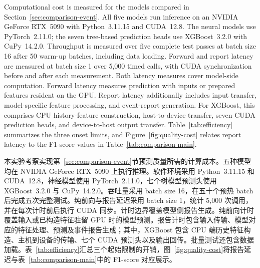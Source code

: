 \documentclass[a4paper,fleqn]{cas-dc}
\newcommand{\zhpara}[1]{%
  \par\begingroup\small\color{black!72}\noindent #1\par\endgroup}
\begin{document}
Computational cost is measured for the models compared in Section~\ref{sec:comparison-event}. All five models run inference on an NVIDIA GeForce RTX~5090 with Python~3.11.15 and CUDA~12.8. The neural models use PyTorch~2.11.0; the seven tree-based prediction heads use XGBoost~3.2.0 with CuPy~14.2.0. Throughput is measured over five complete test passes at batch size 16 after 50 warm-up batches, including data loading. Forward and report latency are measured at batch size 1 over 5,000 timed calls, with CUDA synchronization before and after each measurement. Both latency measures cover model-side computation. Forward latency measures prediction with inputs or prepared features resident on the GPU. Report latency additionally includes input transfer, model-specific feature processing, and event-report generation. For XGBoost, this comprises CPU history-feature construction, host-to-device transfer, seven CUDA prediction heads, and device-to-host output transfer. Table~\ref{tab:efficiency} summarizes the three onset limits, and Figure~\ref{fig:quality-cost} relates report latency to the F1-score values in Table~\ref{tab:comparison-main}.

\zhpara{本实验考察实现第~\ref{sec:comparison-event}节预测质量所需的计算成本。五种模型均在 NVIDIA GeForce RTX~5090 上执行推理。软件环境采用 Python~3.11.15 和 CUDA~12.8，神经模型使用 PyTorch~2.11.0，七个树模型预测头使用 XGBoost~3.2.0 与 CuPy~14.2.0。吞吐量采用 batch size 16，在五十个预热 batch 后完成五次完整测试。纯前向与报告延迟采用 batch size 1，统计 5,000 次调用，并在每次计时前后执行 CUDA 同步。计时边界覆盖模型侧报告生成。纯前向计时覆盖输入或已构造特征驻留 GPU 时的模型预测。报告计时包含输入传输、模型对应的特征处理、预测及事件报告生成；其中，XGBoost 包含 CPU 端历史特征构造、主机到设备的传输、七个 CUDA 预测头以及输出回传。批量测试还包含数据加载。表~\ref{tab:efficiency}汇总三个起始限制的开销，图~\ref{fig:quality-cost}将报告延迟与表~\ref{tab:comparison-main}中的 F1-score 对应展示。}
\end{document}
